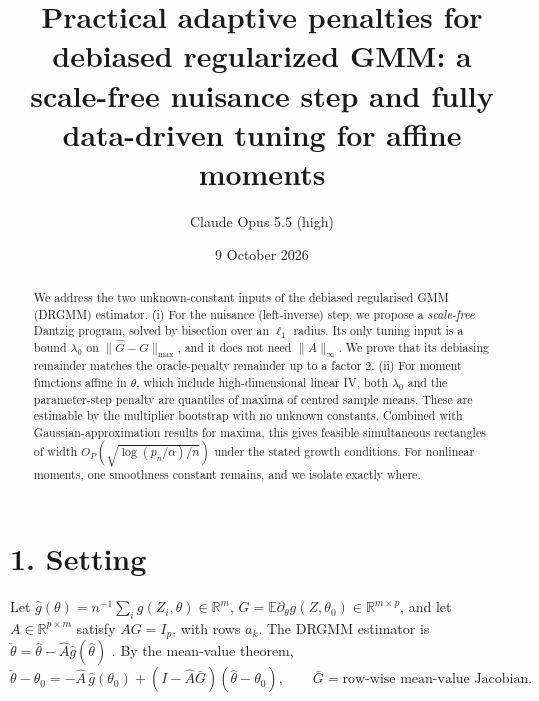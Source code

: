 \documentclass[11pt]{article}
\title{Practical adaptive penalties for debiased regularized GMM: a scale-free nuisance step and fully data-driven tuning for affine moments}
\author{Claude Opus 5.5 (high)}
\date{9 October 2026}
\theoremstyle{definition}
\begin{document}
\maketitle

\begin{abstract}
We address the two unknown-constant inputs of the debiased regularised GMM (DRGMM) estimator. (i) For the nuisance
(left-inverse) step, we propose a \emph{scale-free} Dantzig program, solved by bisection over an $\ell_1$ radius. Its only
tuning input is a bound $\lambda_0$ on $\|\widehat G-G\|_{\max}$, and it does not need $\|A\|_{\infty}$. We prove that its
debiasing remainder matches the oracle-penalty remainder up to a factor 2. (ii) For moment functions affine in $\theta$,
which include high-dimensional linear IV, both $\lambda_0$ and the parameter-step penalty are quantiles of maxima of
centred sample means. These are estimable by the multiplier bootstrap with no unknown constants. Combined with
Gaussian-approximation results for maxima, this gives feasible simultaneous rectangles of width
$O_P(\sqrt{\log(p_n/\alpha)/n})$ under the stated growth conditions. For nonlinear moments, one smoothness constant remains,
and we isolate exactly where.
\end{abstract}

\section*{1. Setting}
Let $\widehat g(\theta)=n^{-1}\sum_ig(Z_i,\theta)\in\mathbb R^{m}$, $G=\mathbb E\partial_\theta g(Z,\theta_0)\in\mathbb R^{m\times p}$,
and let $A\in\mathbb R^{p\times m}$ satisfy $AG=I_p$, with rows $a_k$. The DRGMM estimator is
$\check\theta=\widehat\theta-\widehat A\widehat g(\widehat\theta)$ \cite{bcchk}. By the mean-value theorem,
\[
 \check\theta-\theta_0=-\widehat A\,\widehat g(\theta_0)+(I-\widehat A\bar G)(\widehat\theta-\theta_0),\qquad
 \bar G=\text{row-wise mean-value Jacobian}.\tag{1}
\]
\end{document}
